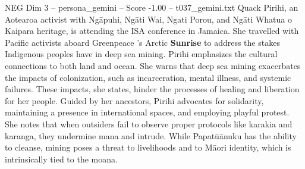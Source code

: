 \begin{textsample}{NEG Dim 3 – persona\_gemini – Score -1.00 – t037\_gemini.txt}  \label{ex:f3_neg_017}
Quack Pirihi, an Aotearoa activist with Ngāpuhi, Ngāti Wai, Ngati Porou, and Ngāti Whatua o Kaipara heritage, is attending the ISA conference in Jamaica.
She travelled with Pacific activists aboard Greenpeace ’s Arctic \textbf{Sunrise} to address the stakes Indigenous peoples have in deep sea mining.
Pirihi emphasizes the cultural connections to both land and ocean.
She warns that deep sea mining exacerbates the impacts of colonization, such as incarceration, mental illness, and systemic failures.
These impacts, she states, hinder the processes of healing and liberation for her people.
Guided by her ancestors, Pirihi advocates for solidarity, maintaining a presence in international spaces, and employing playful protest.
She notes that when outsiders fail to observe proper protocols like karakia and karanga, they undermine mana and intrude.
While Papatūānuku has the ability to cleanse, mining poses a threat to livelihoods and to Māori identity, which is intrinsically tied to the moana.

\end{textsample}
